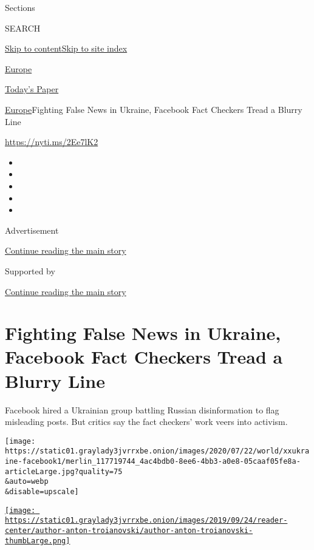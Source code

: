 Sections

SEARCH

\protect\hyperlink{site-content}{Skip to
content}\protect\hyperlink{site-index}{Skip to site index}

\href{https://www.nytimes3xbfgragh.onion/section/world/europe}{Europe}

\href{https://myaccount.nytimes3xbfgragh.onion/auth/login?response_type=cookie\&client_id=vi}{}

\href{https://www.nytimes3xbfgragh.onion/section/todayspaper}{Today's
Paper}

\href{/section/world/europe}{Europe}\textbar{}Fighting False News in
Ukraine, Facebook Fact Checkers Tread a Blurry Line

\url{https://nyti.ms/2Ee7lK2}

\begin{itemize}
\item
\item
\item
\item
\item
\end{itemize}

Advertisement

\protect\hyperlink{after-top}{Continue reading the main story}

Supported by

\protect\hyperlink{after-sponsor}{Continue reading the main story}

\hypertarget{fighting-false-news-in-ukraine-facebook-fact-checkers-tread-a-blurry-line}{%
\section{Fighting False News in Ukraine, Facebook Fact Checkers Tread a
Blurry
Line}\label{fighting-false-news-in-ukraine-facebook-fact-checkers-tread-a-blurry-line}}

Facebook hired a Ukrainian group battling Russian disinformation to flag
misleading posts. But critics say the fact checkers' work veers into
activism.

\texttt{[image: https://static01.graylady3jvrrxbe.onion/images/2020/07/22/world/xxukraine-facebook1/merlin\_117719744\_4ac4bdb0-8ee6-4bb3-a0e8-05caaf05fe8a-articleLarge.jpg?quality=75\\\&auto=webp\\\&disable=upscale]}

\href{https://www.nytimes3xbfgragh.onion/by/anton-troianovski}{\texttt{[image: https://static01.graylady3jvrrxbe.onion/images/2019/09/24/reader-center/author-anton-troianovski/author-anton-troianovski-thumbLarge.png]}}

